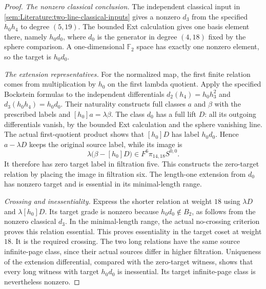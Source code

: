 \begin{proof}
\textit{The nonzero classical conclusion.} The independent classical input in
\ref{sem:Literature:two-line-classical-inputs} gives a nonzero $d_3$ from
the specified $h_0h_4$ to degree $(5,19)$. The bounded Ext calculation gives
one basis element there, namely $h_0d_0$, where $d_0$ is the generator
in degree $(4,18)$ fixed by the sphere comparison. A one-dimensional $\mathbb F_2$ space has
exactly one nonzero element, so the target is $h_0d_0$.

\textit{The extension representatives.} For the normalized
map, the first finite relation comes from multiplication by $h_0$
on the first lambda quotient. Apply the specified Bockstein
formulas to the independent differentials
$d_2(h_4)=h_0h_3^2$ and $d_3(h_0h_4)=h_0d_0$.
Their naturality constructs full classes $a$ and $\beta$ with
the prescribed labels and $[h_0]a=\lambda\beta$.
The class $d_0$ has a full lift $D$: all its outgoing differentials
vanish, by the bounded Ext calculation and the sphere vanishing line.
The actual first-quotient product shows that $[h_0]D$ has label
$h_0d_0$. Hence $a-\lambda D$ keeps the original source label,
while its image is
\[
\lambda\bigl(\beta-[h_0]D\bigr)\in F^6\pi_{14,18}S^{0,0}.
\]
It therefore has zero target label in filtration five. This constructs the zero-target relation by placing the image in filtration six. The length-one extension from $d_0$ has
nonzero target and is essential in its minimal-length range.

\textit{Crossing and inessentiality.} Express the shorter relation
at weight $18$ using $\lambda D$ and $\lambda[h_0]D$.
Its target grade is nonzero because $h_0d_0\notin B_2$, as follows
from the nonzero classical $d_3$. In the minimal-length range,
the actual no-crossing criterion proves this relation essential.
This proves essentiality in the target coset at weight $18$.
It is the required crossing. The two long relations have the
same source infinite-page class, since their actual sources
differ in higher filtration. Uniqueness of the extension
differential, compared with the zero-target witness, shows that
every long witness with target $h_0d_0$ is inessential.
Its target infinite-page class is nevertheless nonzero.


\end{proof}
